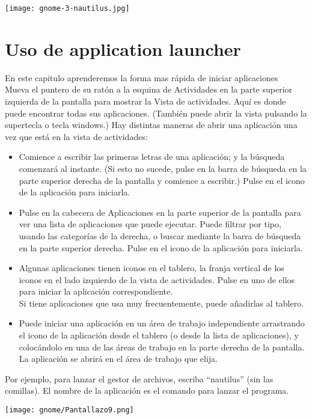 \documentclass[12pt,letterpaper]{book}
\begin{document}
\texttt{[image: gnome-3-nautilus.jpg]} 
\chapter{Uso de application launcher}
En este capitulo aprenderemos la forma mas rápida de iniciar aplicaciones\\

Mueva el puntero de su ratón a la esquina de Actividades en la parte superior izquierda de la pantalla para mostrar la Vista de actividades. Aquí es donde puede encontrar todas sus aplicaciones. (También puede abrir la vista pulsando la supertecla o tecla windows.)
Hay distintas maneras de abrir una aplicación una vez que está en la vista de actividades:
\begin{itemize}
\item Comience a escribir las primeras letras de una aplicación; y la búsqueda comenzará al instante. (Si esto no sucede, pulse en la barra de búsqueda en la parte superior derecha de la pantalla y comience a escribir.) Pulse en el icono de la aplicación para iniciarla.
\item Pulse en la cabecera de Aplicaciones en la parte superior de la pantalla para ver una lista de aplicaciones que puede ejecutar. Puede filtrar por tipo, usando las categorías de la derecha, o buscar mediante la barra de búsqueda en la parte superior derecha. Pulse en el icono de la aplicación para iniciarla.
\item Algunas aplicaciones tienen iconos en el tablero, la franja vertical de los iconos en el lado izquierdo de la vista de actividades. Pulse en uno de ellos para iniciar la aplicación correspondiente.\\
Si tiene aplicaciones que usa muy frecuentemente, puede añadirlas al tablero.
\item Puede iniciar una aplicación en un área de trabajo independiente arrastrando el icono de la aplicación desde el tablero (o desde la lista de aplicaciones), y colocándolo en una de las áreas de trabajo en la parte derecha de la pantalla. La aplicación se abrirá en el área de trabajo que elija.
\end{itemize}
Por ejemplo, para lanzar el gestor de archivos, escriba “nautilus” (sin las comillas). El nombre de la aplicación es el comando para lanzar el programa.
\begin{center}
\texttt{[image: gnome/Pantallazo9.png]} 
\end{center}
\end{document}
